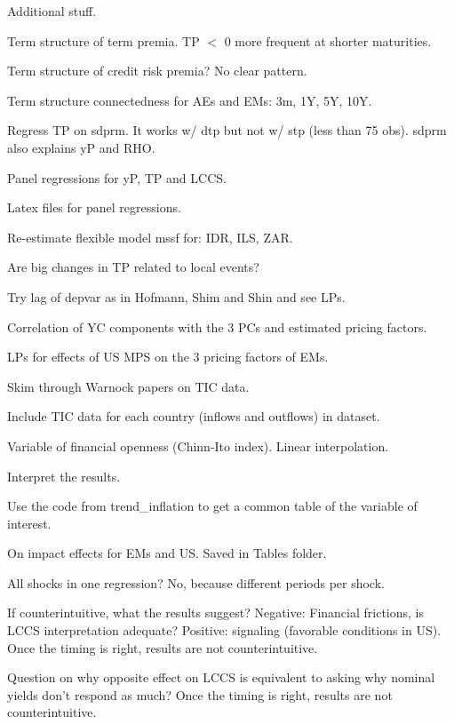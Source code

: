 \documentclass[12pt]{article}
\newcommand{\cmark}{\ding{51}}
\newcommand{\xmark}{\ding{55}}
\newcommand{\done}{\rlap{$\square$}{\raisebox{2pt}{\large\hspace{1pt}\cmark}}%
	\hspace{-2.5pt}}
\newcommand{\wontdo}{\rlap{$\square$}{\large\hspace{1pt}\xmark}}
\begin{document}
\begin{todolist}
	\item Additional stuff.
	\begin{todolist}
		\item[\done] Term structure of term premia. TP \(<\) 0 more frequent at shorter maturities.
		\item[\done] Term structure of credit risk premia? No clear pattern.
		\item[\done] Term structure connectedness for AEs and EMs: 3m, 1Y, 5Y, 10Y.
		\item[\done] Regress TP on sdprm. It works w/ dtp but not w/ stp (less than 75 obs). sdprm also explains yP and RHO.
		\item[\done] Panel regressions for yP, TP and LCCS.
		\item[\done] Latex files for panel regressions.
		\item[\done] Re-estimate flexible model mssf for: IDR, ILS, ZAR.
		\item Are big changes in TP related to local events?
		\item Try lag of depvar as in Hofmann, Shim and Shin and see LPs.
		\item Correlation of YC components with the 3 PCs and estimated pricing factors.
		\item LPs for effects of US MPS on the 3 pricing factors of EMs.
		\item Skim through Warnock papers on TIC data.
		\item Include TIC data for each country (inflows and outflows) in dataset.
		\item Variable of financial openness (Chinn-Ito index). Linear interpolation.
	\end{todolist}
	\item Interpret the results.
	\begin{todolist}
		\item[\done] Use the code from trend_inflation to get a common table of the variable of interest.
		\item[\done] On impact effects for EMs and US. Saved in Tables folder.
		\item[\wontdo] All shocks in one regression? No, because different periods per shock.
		\item[\wontdo] If counterintuitive, what the results suggest? Negative: Financial frictions, is LCCS interpretation adequate? Positive: signaling (favorable conditions in US). Once the timing is right, results are not counterintuitive.
		\item[\wontdo] Question on why opposite effect on LCCS is equivalent to asking why nominal yields don't respond as much? Once the timing is right, results are not counterintuitive.

\end{todolist}
\end{todolist}
\end{document}
